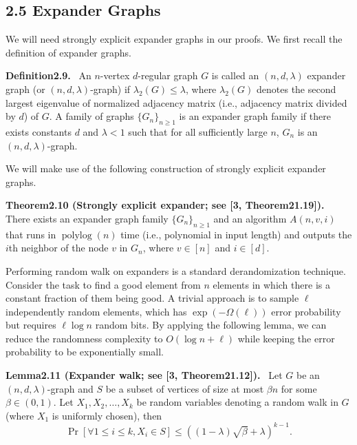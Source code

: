 \documentclass[10pt,a4paper]{article}
\newenvironment{authorclaim}[1]{\par\medskip\noindent\textbf{#1.}\ }{\par\medskip}
\begin{document}
\subsection*{2.5 Expander Graphs}
We will need strongly explicit expander graphs in our proofs. We first recall the definition of expander graphs.
\begin{authorclaim}{Definition2.9}
An $n$-vertex $d$-regular graph $G$ is called an $(n,d,\lambda)$ expander graph (or $(n,d,\lambda)$-graph) if $\lambda_2(G)\le\lambda$, where $\lambda_2(G)$ denotes the second largest eigenvalue of normalized adjacency matrix (i.e., adjacency matrix divided by $d$) of $G$. A family of graphs $\{G_n\}_{n\ge1}$ is an expander graph family if there exists constants $d$ and $\lambda<1$ such that for all sufficiently large $n$, $G_n$ is an $(n,d,\lambda)$-graph.
\end{authorclaim}
We will make use of the following construction of strongly explicit expander graphs.
\begin{authorclaim}{Theorem2.10 (Strongly explicit expander; see [3, Theorem21.19])}
There exists an expander graph family $\{G_n\}_{n\ge1}$ and an algorithm $A(n,v,i)$ that runs in $\operatorname{polylog}(n)$ time (i.e., polynomial in input length) and outputs the $i$th neighbor of the node $v$ in $G_n$, where $v\in[n]$ and $i\in[d]$.
\end{authorclaim}
Performing random walk on expanders is a standard derandomization technique. Consider the task to find a good element from $n$ elements in which there is a constant fraction of them being good. A trivial approach is to sample $\ell$ independently random elements, which has $\exp(-\Omega(\ell))$ error probability but requires $\ell\log n$ random bits. By applying the following lemma, we can reduce the randomness complexity to $O(\log n+\ell)$ while keeping the error probability to be exponentially small.
\begin{authorclaim}{Lemma2.11 (Expander walk; see [3, Theorem21.12])}
Let $G$ be an $(n,d,\lambda)$-graph and $S$ be a subset of vertices of size at most $\beta n$ for some $\beta\in(0,1)$. Let $X_1,X_2,\ldots,X_k$ be random variables denoting a random walk in $G$ (where $X_1$ is uniformly chosen), then
\[\Pr[\forall1\le i\le k, X_i\in S]\le((1-\lambda)\sqrt\beta+\lambda)^{k-1}.\]
\end{authorclaim}
\end{document}
